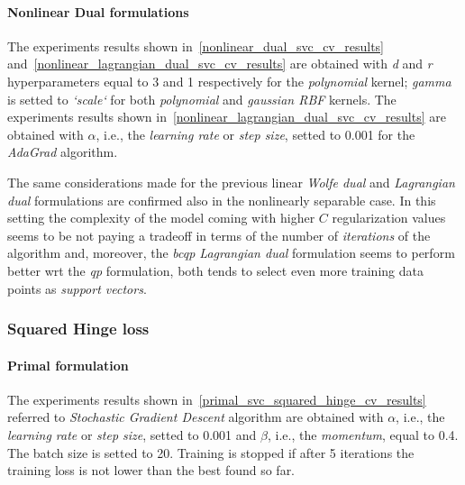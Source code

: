 \paragraph{Nonlinear Dual formulations}

The experiments results shown in~\ref{nonlinear_dual_svc_cv_results} and~\ref{nonlinear_lagrangian_dual_svc_cv_results} are obtained with \emph{d} and \emph{r} hyperparameters equal to 3 and 1 respectively for the \emph{polynomial} kernel; \emph{gamma} is setted to \emph{`scale`} for both \emph{polynomial} and \emph{gaussian RBF} kernels. The experiments results shown in~\ref{nonlinear_lagrangian_dual_svc_cv_results} are obtained with $\alpha$, i.e., the \emph{learning rate} or \emph{step size}, setted to 0.001 for the \emph{AdaGrad} algorithm.





The same considerations made for the previous linear \emph{Wolfe dual} and \emph{Lagrangian dual} formulations are confirmed also in the nonlinearly separable case. In this setting the complexity of the model coming with higher $C$ regularization values seems to be not paying a tradeoff in terms of the number of \emph{iterations} of the algorithm and, moreover, the \emph{bcqp Lagrangian dual} formulation seems to perform better wrt the \emph{qp} formulation, both tends to select even more training data points as \emph{support vectors}.

\pagebreak

\subsubsection{Squared Hinge loss}

\paragraph{Primal formulation}

The experiments results shown in~\ref{primal_svc_squared_hinge_cv_results} referred to \emph{Stochastic Gradient Descent} algorithm are obtained with $\alpha$, i.e., the \emph{learning rate} or \emph{step size}, setted to 0.001 and $\beta$, i.e., the \emph{momentum}, equal to 0.4. The batch size is setted to 20. Training is stopped if after 5 iterations the training loss is not lower than the best found so far.



